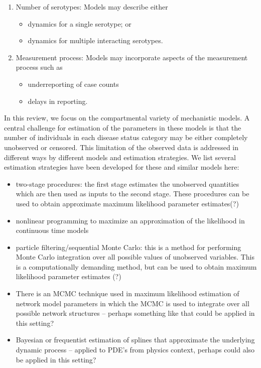 \documentclass[fleqn]{article}\usepackage[]{graphicx}\usepackage[]{color}
\begin{document}
\begin{enumerate}
\begin{itemize}
	\end{itemize}
\item Number of serotypes: Models may describe either
	\begin{itemize}
	\item dynamics for a single serotype; or
	\item dynamics for multiple interacting serotypes.
	\end{itemize}
\item Measurement process: Models may incorporate aspects of the measurement process such as
	\begin{itemize}
	\item underreporting of case counts
	\item delays in reporting.
	\end{itemize}
\end{enumerate}

In this review, we focus on the compartmental variety of mechanistic models.  A central challenge for estimation of the parameters in these models is that the number of individuals in each disease status category may be either completely unobserved or censored.  This limitation of the observed data is addressed in different ways by different models and estimation strategies.  We list several estimation strategies have been developed for these and similar models here:
\begin{itemize}
\item two-stage procedures: the first stage estimates the unobserved quantities which are then used as inputs to the second stage.  These procedures can be used to obtain approximate maximum likelihood parameter estimates(?)
\item nonlinear programming to maximize an approximation of the likelihood in continuous time models
\item particle filtering/sequential Monte Carlo: this is a method for performing Monte Carlo integration over all possible values of unobserved variables.  This is a computationally demanding method, but can be used to obtain maximum likelihood parameter estimates (?)
\item There is an MCMC technique used in maximum likelihood estimation of network model parameters in which the MCMC is used to integrate over all possible network structures -- perhaps something like that could be applied in this setting?
\item Bayesian or frequentist estimation of splines that approximate the underlying dynamic process -- applied to PDE's from physics context, perhaps could also be applied in this setting?
\end{itemize}
\end{document}

